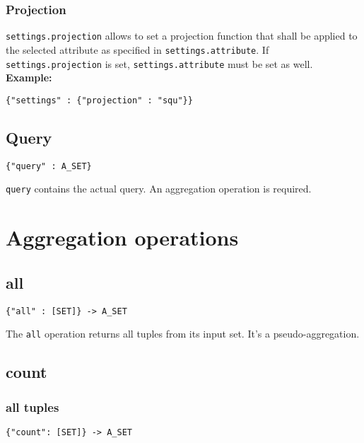 \documentclass[a4paper]{article}
\begin{document}
\subsubsection{Projection}

\verb|settings.projection| allows to set a projection function that
shall be applied to the selected attribute as specified in
\verb|settings.attribute|. If \verb|settings.projection| is set,
\verb|settings.attribute| must be set as well. \\

\textbf{Example:}
\begin{verbatim}
{"settings" : {"projection" : "squ"}}
\end{verbatim}

\subsection{Query}

\begin{verbatim}
{"query" : A_SET}
\end{verbatim}

\verb|query| contains the actual query. An aggregation operation is required.

\section{Aggregation operations}

\subsection{all}

\begin{verbatim}
{"all" : [SET]} -> A_SET
\end{verbatim}

The \verb|all| operation returns all tuples from its input set. It's a pseudo-aggregation.

\subsection{count}

\subsubsection{all tuples}

\begin{verbatim}
{"count": [SET]} -> A_SET
\end{verbatim}
\end{document}
